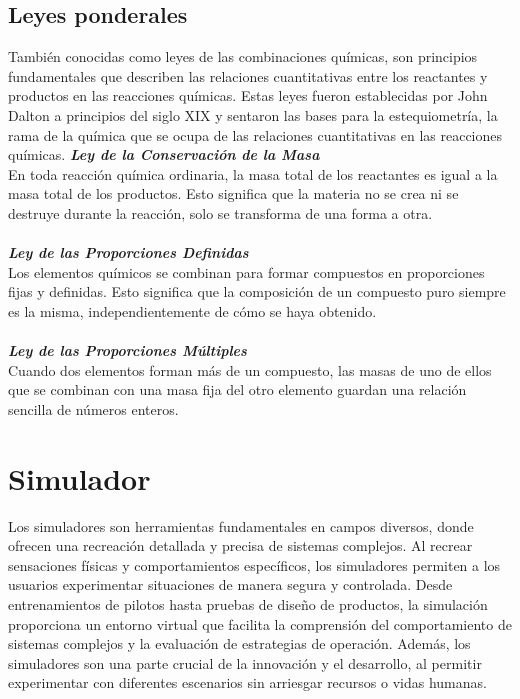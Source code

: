 \subsection{Leyes ponderales}
También conocidas como leyes de las combinaciones químicas, son principios fundamentales que describen las relaciones cuantitativas entre los reactantes y productos en las reacciones químicas. Estas leyes fueron establecidas por John Dalton a principios del siglo XIX y sentaron las bases para la estequiometría, la rama de la química que se ocupa de las relaciones cuantitativas en las reacciones químicas\cite{Fernando2021}.
\newpage
\textbf{\textit{Ley de la Conservación de la Masa}}\\
En toda reacción química ordinaria, la masa total de los reactantes es igual a la masa total de los productos. Esto significa que la materia no se crea ni se destruye durante la reacción, solo se transforma de una forma a otra.
\\\\
\textbf{\textit{Ley de las Proporciones Definidas}}\\
Los elementos químicos se combinan para formar compuestos en proporciones fijas y definidas. Esto significa que la composición de un compuesto puro siempre es la misma, independientemente de cómo se haya obtenido.
\\\\
\textbf{\textit{Ley de las Proporciones Múltiples}}\\
Cuando dos elementos forman más de un compuesto, las masas de uno de ellos que se combinan con una masa fija del otro elemento guardan una relación sencilla de números enteros.

\section{Simulador}
Los simuladores son herramientas fundamentales en campos diversos, donde ofrecen una recreación detallada y precisa de sistemas complejos. Al recrear sensaciones físicas y comportamientos específicos, los simuladores permiten a los usuarios experimentar situaciones de manera segura y controlada. Desde entrenamientos de pilotos hasta pruebas de diseño de productos, la simulación proporciona un entorno virtual que facilita la comprensión del comportamiento de sistemas complejos y la evaluación de estrategias de operación. Además, los simuladores son una parte crucial de la innovación y el desarrollo, al permitir experimentar con diferentes escenarios sin arriesgar recursos o vidas humanas.


